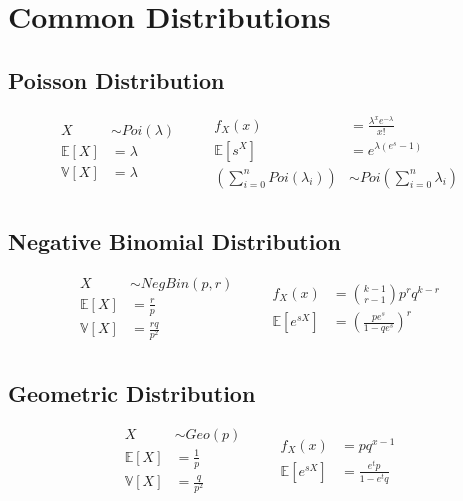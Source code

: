 \section{Common Distributions}
\subsection{Poisson Distribution}
\begin{equation*}
    \begin{aligned}
        X &\sim Poi(\lambda) \qquad\\
        \mathbb{E}[X] &= \lambda \\
        \mathbb{V}[X] &= \lambda \\
    \end{aligned}
    \begin{aligned}
        f_X(x) &= \frac{\lambda^x e^{-\lambda}}{x!} \\
        \mathbb{E}[s^X] &= e^{\lambda \left(e^s - 1\right)} \\
        \left(\sum_{i=0}^nPoi(\lambda_i) \right) &\sim Poi \left(\sum_{i=0}^n \lambda_i \right)\\
    \end{aligned}
\end{equation*}

\subsection{Negative Binomial Distribution}
\begin{equation*}
    \begin{aligned}
        X &\sim NegBin(p, r) \qquad\\
        \mathbb{E}[X] &= \frac{r}{p} \\
        \mathbb{V}[X] &= \frac{rq}{p^2} \\
    \end{aligned}
    \begin{aligned}
        f_X(x) &= \binom{k-1}{r-1}p^rq^{k-r} \\
        \mathbb{E}[e^{sX}] &= \left(\frac{pe^s}{1 - qe^s}\right)^r \\
    \end{aligned}
\end{equation*}

\subsection{Geometric Distribution}
\begin{equation*}
    \begin{aligned}
        X &\sim Geo(p) \qquad\\
        \mathbb{E}[X] &= \frac{1}{p} \\
        \mathbb{V}[X] &= \frac{q}{p^2} \\
    \end{aligned}
    \begin{aligned}
        f_X(x) &= pq^{x-1}              \\
        \mathbb{E}[e^{sX}] &= \frac{e^tp}{1 - e^tq} \\
    \end{aligned}
\end{equation*}

